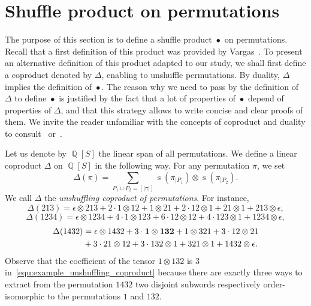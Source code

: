 \documentclass[a4paper]{llncs}
\DeclareMathOperator{\QQ}{\mathbb{Q}}
\DeclareMathOperator{\STD}{\mathrm{s}}
\DeclareMathOperator{\SHUFFLE}{\bullet}
\begin{document}

\section{Shuffle product on permutations}
\label{section:Shuffle product on permutations}

The purpose of this section is to define a shuffle product $\SHUFFLE$
on permutations. Recall that a first definition of this product was
provided by Vargas~\cite{Vargas:2014}. To present an alternative
definition of this product adapted to our study, we shall first define
a coproduct denoted by $\Delta$, enabling to unshuffle permutations.
By duality, $\Delta$ implies the definition of $\SHUFFLE$. The reason
why we need to pass by the definition of $\Delta$ to define $\SHUFFLE$
is justified by the fact that a lot of properties of $\SHUFFLE$ depend
of properties of $\Delta$, and that this strategy allows to write concise
and clear proofs of them. We invite the reader unfamiliar with the
concepts of coproduct and duality to consult~\cite{Joni:Rota:1979}
or~\cite{Grinberg:Reiner:2014}.

Let us denote by $\QQ[S]$ the linear span of all permutations. We
define a linear coproduct $\Delta$ on $\QQ[S]$ in the following way. For
any permutation $\pi$, we set
\begin{equation} \label{equ:unshuffling_coproduct}
    \Delta(\pi) =
    \sum_{P_1 \sqcup P_2 = [|\pi|]}
    \STD\left(\pi_{|P_1}\right) \otimes \STD\left(\pi_{|P_2}\right).
\end{equation}
We call $\Delta$ the {\em unshuffling coproduct of permutations}. For
instance,
\begin{equation}
    \Delta(213) =
    \epsilon \otimes 213 + 2 \cdot 1 \otimes 12 +
    1 \otimes 21 + 2 \cdot 12 \otimes 1 + 21 \otimes 1
    + 213 \otimes \epsilon,
\end{equation}
\begin{equation}
    \Delta(1234) =
    \epsilon \otimes 1234 + 4 \cdot 1 \otimes 123 + 6 \cdot 12 \otimes 12 +
    4 \cdot 123 \otimes 1 + 1234 \otimes \epsilon,
\end{equation}
\begin{equation}\begin{split} \label{equ:example_unshuffling_coproduct}
    \Delta(1432) & =
    \epsilon \otimes 1432 + 3 \cdot {\bf 1 \otimes 132} + 1 \otimes 321 +
    3 \cdot 12 \otimes 21 \\ & + 3 \cdot 21 \otimes 12
    + 3 \cdot 132 \otimes 1 + 321 \otimes 1 + 1432 \otimes \epsilon.
\end{split}\end{equation}
Observe that the coefficient of the tensor $1 \otimes 132$ is $3$
in~\eqref{equ:example_unshuffling_coproduct} because there are exactly
three ways to extract from the permutation $1432$ two disjoint subwords
respectively order-isomorphic to the permutations $1$ and $132$.
\end{document}

